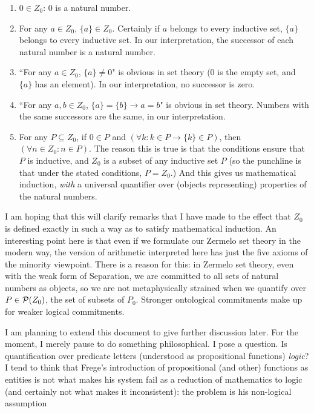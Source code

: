 \documentclass[12pt]{article}
\begin{document}
\begin{enumerate}

\item $0 \in Z_0$:  0 is a natural number.

\item For any $a \in Z_0$, $\{a\} \in Z_0$.  Certainly if $a$ belongs to every inductive set, $\{a\}$ belongs to every inductive set.  In our interpretation, the successor of each natural number is a natural number.

\item ``For any $a \in Z_0$, $\{a\} \neq 0$" is obvious in set theory (0 is the empty set, and $\{a\}$ has an element).  In our interpretation, no successor is zero.

\item ``For any $a,b\in Z_0$, $\{a\} = \{b\} \rightarrow a=b$" is obvious in set theory.  Numbers with the same successors are the same, in    our interpretation.

\item For any $P \subseteq Z_0$, if $0 \in P$ and $(\forall k:k \in P \rightarrow \{k\} \in P)$, then $(\forall n \in Z_0:n \in P)$.
The reason this is true is that the conditions ensure that $P$ is inductive, and $Z_0$ is a subset of any inductive set $P$ (so the punchline is that under the stated conditions, $P=Z_0$.)  And this gives us mathematical induction, {\em with\/} a universal quantifier over (objects representing) properties of the natural numbers.


\end{enumerate}

I am hoping that this will clarify remarks that I have made to the effect that $Z_0$ is defined exactly in such a way as to satisfy mathematical induction.   An interesting point here is that even if we formulate our Zermelo set theory in the modern way, the version of arithmetic interpreted here has just the five axioms of the minority viewpoint.  There is a reason for this:  in Zermelo set theory, even with the weak form of Separation, we are committed to all sets of natural numbers as objects, so we are not metaphysically strained when we quantify over $P \in {\cal P}(Z_0)$, the set of subsets of $P_0$.  Stronger ontological commitments make up for weaker logical commitments.

I am planning to extend this document to give further discussion later.  For the moment, I merely pause to do something philosophical.  I pose a question.  Is quantification over predicate letters (understood as propositional functions) {\em logic\/}?
I tend to think that Frege's introduction of propositional (and other) functions as entities is not what makes his system fail as a reduction of mathematics to logic (and certainly not what makes it inconsistent):  the problem is his non-logical assumption
\end{document}
